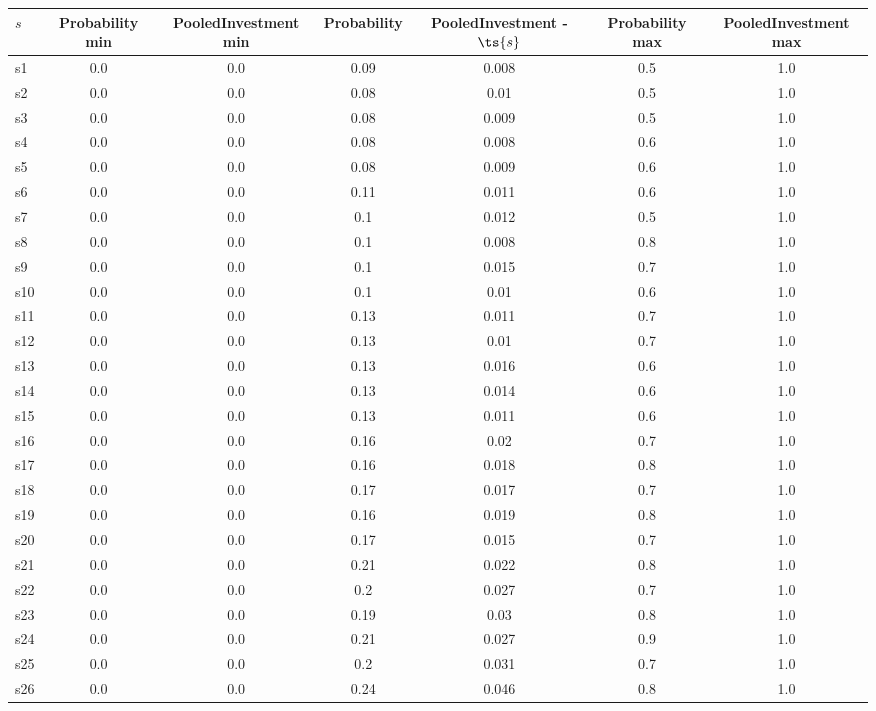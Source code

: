 \documentclass{article}
\begin{document}
\noindent\begin{tabular}{|l|c|c|c|c|c|c|}
\hline
$s$& Probability min & PooledInvestment min & Probability & PooledInvestment - $\ts{s}$ & Probability max & PooledInvestment max\\
\hline
s1 &0.0 & 0.0 & 0.09 & 0.008 & 0.5 & 1.0\\
\hline
s2 &0.0 & 0.0 & 0.08 & 0.01 & 0.5 & 1.0\\
\hline
s3 &0.0 & 0.0 & 0.08 & 0.009 & 0.5 & 1.0\\
\hline
s4 &0.0 & 0.0 & 0.08 & 0.008 & 0.6 & 1.0\\
\hline
s5 &0.0 & 0.0 & 0.08 & 0.009 & 0.6 & 1.0\\
\hline
s6 &0.0 & 0.0 & 0.11 & 0.011 & 0.6 & 1.0\\
\hline
s7 &0.0 & 0.0 & 0.1 & 0.012 & 0.5 & 1.0\\
\hline
s8 &0.0 & 0.0 & 0.1 & 0.008 & 0.8 & 1.0\\
\hline
s9 &0.0 & 0.0 & 0.1 & 0.015 & 0.7 & 1.0\\
\hline
s10 &0.0 & 0.0 & 0.1 & 0.01 & 0.6 & 1.0\\
\hline
s11 &0.0 & 0.0 & 0.13 & 0.011 & 0.7 & 1.0\\
\hline
s12 &0.0 & 0.0 & 0.13 & 0.01 & 0.7 & 1.0\\
\hline
s13 &0.0 & 0.0 & 0.13 & 0.016 & 0.6 & 1.0\\
\hline
s14 &0.0 & 0.0 & 0.13 & 0.014 & 0.6 & 1.0\\
\hline
s15 &0.0 & 0.0 & 0.13 & 0.011 & 0.6 & 1.0\\
\hline
s16 &0.0 & 0.0 & 0.16 & 0.02 & 0.7 & 1.0\\
\hline
s17 &0.0 & 0.0 & 0.16 & 0.018 & 0.8 & 1.0\\
\hline
s18 &0.0 & 0.0 & 0.17 & 0.017 & 0.7 & 1.0\\
\hline
s19 &0.0 & 0.0 & 0.16 & 0.019 & 0.8 & 1.0\\
\hline
s20 &0.0 & 0.0 & 0.17 & 0.015 & 0.7 & 1.0\\
\hline
s21 &0.0 & 0.0 & 0.21 & 0.022 & 0.8 & 1.0\\
\hline
s22 &0.0 & 0.0 & 0.2 & 0.027 & 0.7 & 1.0\\
\hline
s23 &0.0 & 0.0 & 0.19 & 0.03 & 0.8 & 1.0\\
\hline
s24 &0.0 & 0.0 & 0.21 & 0.027 & 0.9 & 1.0\\
\hline
s25 &0.0 & 0.0 & 0.2 & 0.031 & 0.7 & 1.0\\
\hline
s26 &0.0 & 0.0 & 0.24 & 0.046 & 0.8 & 1.0\\

\end{tabular}
\end{document}
